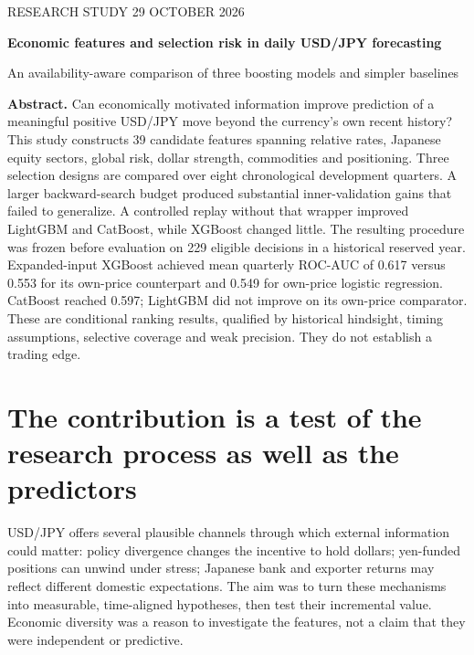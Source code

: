 \documentclass[11pt,a4paper]{article}
\begin{document}
\thispagestyle{plain}
{\small\sffamily\color{muted}RESEARCH STUDY \hfill 29 OCTOBER 2026}\par
\vspace{10pt}
{\fontsize{25}{29}\selectfont\bfseries\color{ink}Economic features and selection risk in daily USD/JPY forecasting\par}
\vspace{8pt}{\normalsize Sai Reddivari}\par
{\small\color{muted}An availability-aware comparison of three boosting models and simpler baselines}\par
{}\vspace{8pt}

\textbf{Abstract.} Can economically motivated information improve prediction of a meaningful positive USD/JPY move beyond the currency's own recent history? This study constructs 39 candidate features spanning relative rates, Japanese equity sectors, global risk, dollar strength, commodities and positioning. Three selection designs are compared over eight chronological development quarters. A larger backward-search budget produced substantial inner-validation gains that failed to generalize. A controlled replay without that wrapper improved LightGBM and CatBoost, while XGBoost changed little. The resulting procedure was frozen before evaluation on 229 eligible decisions in a historical reserved year. Expanded-input XGBoost achieved mean quarterly ROC-AUC of 0.617 versus 0.553 for its own-price counterpart and 0.549 for own-price logistic regression. CatBoost reached 0.597; LightGBM did not improve on its own-price comparator. These are conditional ranking results, qualified by historical hindsight, timing assumptions, selective coverage and weak precision. They do not establish a trading edge.

\section*{The contribution is a test of the research process as well as the predictors}
USD/JPY offers several plausible channels through which external information could matter: policy divergence changes the incentive to hold dollars; yen-funded positions can unwind under stress; Japanese bank and exporter returns may reflect different domestic expectations. The aim was to turn these mechanisms into measurable, time-aligned hypotheses, then test their incremental value. Economic diversity was a reason to investigate the features, not a claim that they were independent or predictive.
\end{document}
